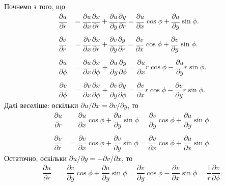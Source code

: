 \begin{solution}
    Почнемо з того, що 
    \begin{align*}
        \dfrac {\partial u}{\partial r} &= \dfrac {\partial u}{\partial x} \dfrac {\partial x}{\partial r} + \dfrac {\partial u}{\partial y} \dfrac {\partial y}{\partial r} = \dfrac {\partial u}{\partial x} \cos \phi + \dfrac {\partial u}{\partial y} \sin \phi. \\
        \\
        \dfrac {\partial v}{\partial r} &= \dfrac {\partial v}{\partial x} \dfrac {\partial x}{\partial r} + \dfrac {\partial v}{\partial y} \dfrac {\partial y}{\partial r} = \dfrac {\partial v}{\partial x} \cos \phi + \dfrac {\partial v}{\partial y} \sin \phi. \\
        \\
        \dfrac {\partial u}{\partial \phi} &= \dfrac {\partial u}{\partial x} \dfrac {\partial x}{\partial \phi} + \dfrac {\partial u}{\partial y} \dfrac {\partial y}{\partial \phi} = \dfrac {\partial u}{\partial x} r \cos \phi - \dfrac {\partial u}{\partial y} r \sin \phi. \\
        \\
        \dfrac {\partial v}{\partial \phi} &= \dfrac {\partial v}{\partial x} \dfrac {\partial x}{\partial \phi} + \dfrac {\partial v}{\partial y} \dfrac {\partial y}{\partial \phi} = \dfrac {\partial v}{\partial x} r \cos \phi - \dfrac {\partial v}{\partial y} r \sin \phi.
    \end{align*}
    Далі веселіше: оскільки $\partial u / \partial x = \partial v / \partial y$, то
    \begin{align*}
        \dfrac {\partial u}{\partial r} &= \dfrac {\partial u}{\partial x} \cos \phi + \dfrac {\partial u}{\partial y} \sin \phi = \dfrac {\partial v}{\partial y} \cos \phi + \dfrac {\partial u}{\partial y} \sin \phi. \\
        \\
        \dfrac {\partial v}{\partial r} &= \dfrac {\partial v}{\partial x} \cos \phi + \dfrac {\partial v}{\partial y} \sin \phi = \dfrac {\partial v}{\partial x} \cos \phi + \dfrac {\partial u}{\partial x} \sin \phi.
    \end{align*}
    Остаточно, оскільки $\partial u / \partial y = - \partial v / \partial x$, то
    \begin{align*}
        \dfrac {\partial u}{\partial r} &= \dfrac {\partial v}{\partial y} \cos \phi + \dfrac {\partial u}{\partial y} \sin \phi = \dfrac {\partial v}{\partial y} \cos \phi - \dfrac {\partial v}{\partial x} \sin \phi = \dfrac 1r \dfrac {\partial v}{\partial \phi}. \\

\end{align*}
\end{solution}
